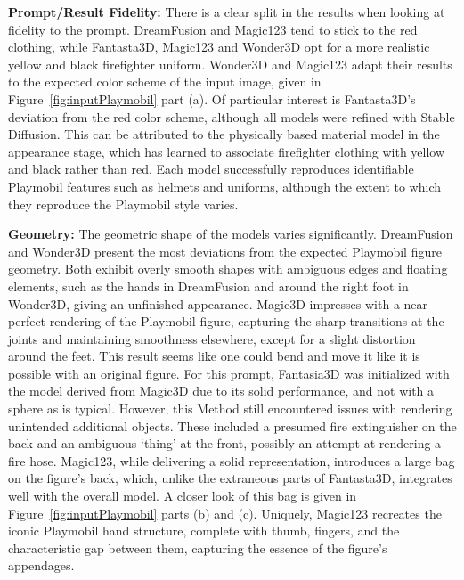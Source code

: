 \textbf{Prompt/Result Fidelity:} There is a clear split in the results when looking at fidelity to the prompt. DreamFusion and Magic123 tend to stick to the red clothing, while Fantasta3D, Magic123 and Wonder3D opt for a more realistic yellow and black firefighter uniform. Wonder3D and Magic123 adapt their results to the expected color scheme of the input image, given in Figure~\ref{fig:inputPlaymobil} part (a). Of particular interest is Fantasta3D's deviation from the red color scheme, although all models were refined with Stable Diffusion. This can be attributed to the physically based material model in the appearance stage, which has learned to associate firefighter clothing with yellow and black rather than red. Each model successfully reproduces identifiable Playmobil features such as helmets and uniforms, although the extent to which they reproduce the Playmobil style varies.

\textbf{Geometry:} The geometric shape of the models varies significantly. DreamFusion and Wonder3D present the most deviations from the expected Playmobil figure geometry. Both exhibit overly smooth shapes with ambiguous edges and floating elements, such as the hands in DreamFusion and around the right foot in Wonder3D, giving an unfinished appearance. Magic3D impresses with a near-perfect rendering of the Playmobil figure, capturing the sharp transitions at the joints and maintaining smoothness elsewhere, except for a slight distortion around the feet. This result seems like one could bend and move it like it is possible with an original figure. For this prompt, Fantasia3D was initialized with the model derived from Magic3D due to its solid performance, and not with a sphere as is typical. However, this Method still encountered issues with rendering unintended additional objects. These included a presumed fire extinguisher on the back and an ambiguous `thing' at the front, possibly an attempt at rendering a fire hose. Magic123, while delivering a solid representation, introduces a large bag on the figure's back, which, unlike the extraneous parts of Fantasta3D, integrates well with the overall model. A closer look of this bag is given in Figure~\ref{fig:inputPlaymobil} parts (b) and (c). Uniquely, Magic123 recreates the iconic Playmobil hand structure, complete with thumb, fingers, and the characteristic gap between them, capturing the essence of the figure's appendages.

